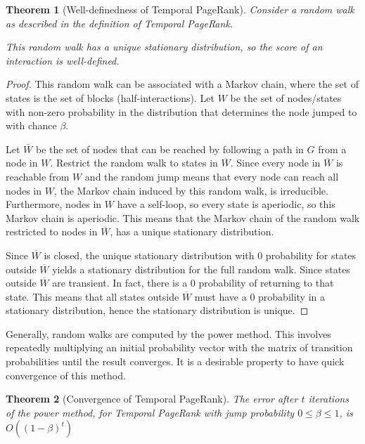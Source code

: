 \documentclass[a4paper,11pt]{book}
\newcommand{\ov}{\overline}
\newtheorem{theorem}{Theorem}
\theoremstyle{definition}
\begin{document}
\begin{theorem}[Well-definedness of Temporal PageRank]
    Consider a random walk as described in the definition of Temporal PageRank.

    This random walk has a unique stationary distribution, so the score of an interaction is well-defined.
    \label{thm:well_defined}
\end{theorem}
\begin{proof}
    This random walk can be associated with a Markov chain, where the set of states is the set of
    blocks (half-interactions). Let $W$ be the set of nodes/states with non-zero probability in the distribution
    that determines the node jumped to with chance $\beta$.

    Let $\ov{W}$ be the set of nodes that can be reached by following a path in $G$ from a node
    in $W$. Restrict the random walk to states in $\ov{W}$. Since every node in $\ov{W}$ is reachable
    from $W$ and the random jump means that every node can reach all nodes in $W$, the Markov chain
    induced by this random walk, is irreducible. Furthermore, nodes in $W$ have a self-loop, so every
    state is aperiodic, so this Markov chain is aperiodic. This means that the Markov chain of the
    random walk restricted to nodes in $\ov{W}$, has a unique stationary distribution.

    Since $\ov{W}$ is closed, the unique stationary distribution with $0$ probability for states outside
    $\ov{W}$ yields a stationary distribution for the full random walk. Since states
    outside $\ov{W}$ are transient. In fact, there is a $0$ probability of returning to that
    state. This means that all states outside $\ov{W}$ must have a $0$ probability in a stationary
    distribution, hence the stationary distribution is unique.
\end{proof}

Generally, random walks are computed by the power method. This involves repeatedly
multiplying an initial probability vector with the matrix of transition probabilities until
the result converges. It is a desirable property to have quick convergence of this method.

\begin{theorem}[Convergence of Temporal PageRank]
    The error after $t$ iterations of the power method, for Temporal PageRank with
    jump probability $0 \leq \beta \leq 1$, is $O((1-\beta)^t)$
    \label{thm:conv_tpr}
\end{theorem}
\end{document}
